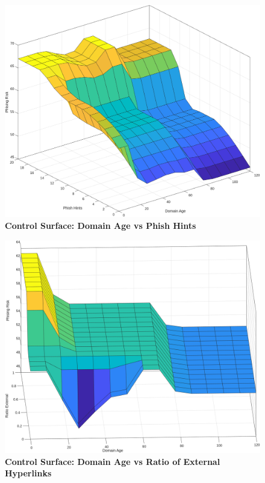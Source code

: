 \documentclass[11pt]{article}
\begin{document}
\begin{appendices}
\begin{figure}[H]
    \begin{minipage}{0.45\textwidth}
        \includegraphics[width=\textwidth]{surface_plots/domain_age_pish_hints.png}
        \centering
        \textbf{Control Surface: Domain Age vs Phish Hints}
    \end{minipage}
    \hfill
    \begin{minipage}{0.45\textwidth}
        \includegraphics[width=\textwidth]{surface_plots/domain_age_ratio_external.png}
        \centering
        \textbf{Control Surface: Domain Age vs Ratio of External Hyperlinks}
    \end{minipage}
    \vspace{0.5cm}
    

\end{figure}
\end{appendices}
\end{document}
